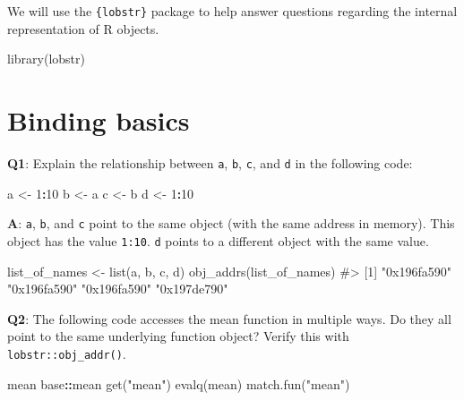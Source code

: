 \documentclass[
]{krantz}
\makeatletter
\newenvironment{Shaded}{\begin{snugshade}}{\end{snugshade}}
\newcommand{\CommentTok}[1]{\textcolor[rgb]{0.56,0.35,0.01}{\textit{#1}}}
\newcommand{\DecValTok}[1]{\textcolor[rgb]{0.00,0.00,0.81}{#1}}
\newcommand{\KeywordTok}[1]{\textcolor[rgb]{0.13,0.29,0.53}{\textbf{#1}}}
\newcommand{\NormalTok}[1]{#1}
\newcommand{\OperatorTok}[1]{\textcolor[rgb]{0.81,0.36,0.00}{\textbf{#1}}}
\newcommand{\StringTok}[1]{\textcolor[rgb]{0.31,0.60,0.02}{#1}}
\newenvironment{kframe}{%
\medskip{}
\setlength{\fboxsep}{.8em}
 \def\at@end@of@kframe{}%
 \ifinner\ifhmode%
  \def\at@end@of@kframe{\end{minipage}}%
  \begin{minipage}{\columnwidth}%
 \fi\fi%
 \def\FrameCommand##1{\hskip\@totalleftmargin \hskip-\fboxsep
 \colorbox{shadecolor}{##1}\hskip-\fboxsep
     \hskip-\linewidth \hskip-\@totalleftmargin \hskip\columnwidth}%
 \MakeFramed {\advance\hsize-\width
   \@totalleftmargin\z@ \linewidth\hsize
   \@setminipage}}%
 {\par\unskip\endMakeFramed%
 \at@end@of@kframe}
\renewenvironment{Shaded}{\begin{kframe}}{\end{kframe}}
\renewcommand{\KeywordTok} [1]{\textcolor[rgb]{0.00,0.44,0.13}{{#1}}}
\renewcommand{\DecValTok}  [1]{\textcolor[rgb]{0.25,0.63,0.44}{{#1}}}
\renewcommand{\StringTok}  [1]{\textcolor[rgb]{0.25,0.44,0.63}{{#1}}}
\renewcommand{\CommentTok} [1]{\textcolor[rgb]{0.38,0.63,0.69}{{#1}}}
\renewcommand{\NormalTok}  [1]{{#1}}
\makeatother
\begin{document}
We will use the \texttt{\{lobstr\}} package to help answer questions regarding the internal representation of R objects.

\begin{Shaded}
\begin{Highlighting}[]
\KeywordTok{library}\NormalTok{(lobstr) }
\end{Highlighting}
\end{Shaded}


\hypertarget{binding-basics}{%
\section{Binding basics}\label{binding-basics}}

\textbf{{Q1}}: Explain the relationship between \texttt{a}, \texttt{b}, \texttt{c}, and \texttt{d} in the following code:

\begin{Shaded}
\begin{Highlighting}[]
\NormalTok{a <-}\StringTok{ }\DecValTok{1}\OperatorTok{:}\DecValTok{10}
\NormalTok{b <-}\StringTok{ }\NormalTok{a}
\NormalTok{c <-}\StringTok{ }\NormalTok{b}
\NormalTok{d <-}\StringTok{ }\DecValTok{1}\OperatorTok{:}\DecValTok{10}
\end{Highlighting}
\end{Shaded}

\textbf{{A}}: \texttt{a}, \texttt{b}, and \texttt{c} point to the same object (with the same address in memory). This object has the value \texttt{1:10}. \texttt{d} points to a different object with the same value.

\begin{Shaded}
\begin{Highlighting}[]
\NormalTok{list_of_names <-}\StringTok{ }\KeywordTok{list}\NormalTok{(a, b, c, d)}
\KeywordTok{obj_addrs}\NormalTok{(list_of_names)}
\CommentTok{#> [1] "0x196fa590" "0x196fa590" "0x196fa590" "0x197de790"}
\end{Highlighting}
\end{Shaded}

\textbf{{Q2}}: The following code accesses the mean function in multiple ways. Do they all point to the same underlying function object? Verify this with \texttt{lobstr::obj\_addr()}.

\begin{Shaded}
\begin{Highlighting}[]
\NormalTok{mean}
\NormalTok{base}\OperatorTok{::}\NormalTok{mean}
\KeywordTok{get}\NormalTok{(}\StringTok{"mean"}\NormalTok{)}
\KeywordTok{evalq}\NormalTok{(mean)}
\KeywordTok{match.fun}\NormalTok{(}\StringTok{"mean"}\NormalTok{)}
\end{Highlighting}
\end{Shaded}
\end{document}
